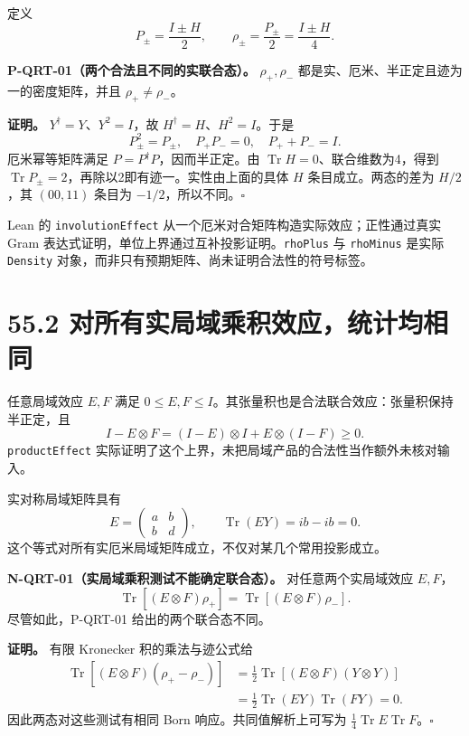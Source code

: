 \documentclass[
  11pt,
  oneside]{book}
\begin{document}
定义 \[
P_\pm=\frac{I\pm H}{2},\qquad
\rho_\pm=\frac{P_\pm}{2}=\frac{I\pm H}{4}.
\]

\protect\hypertarget{p-qrt-01}{}{}

\textbf{P-QRT-01（两个合法且不同的实联合态）。} \(\rho_+,\rho_-\)
都是实、厄米、半正定且迹为一的密度矩阵，并且 \(\rho_+\ne\rho_-\)。

\textbf{证明。} \(Y^\dagger=Y\)、\(Y^2=I\)，故
\(H^\dagger=H\)、\(H^2=I\)。于是 \[
P_\pm^2=P_\pm,\quad P_+P_-=0,\quad P_++P_-=I.
\] 厄米幂等矩阵满足 \(P=P^\dagger P\)，因而半正定。由
\(\operatorname{Tr}H=0\)、联合维数为4，得到
\(\operatorname{Tr}P_\pm=2\)，再除以2即有迹一。实性由上面的具体 \(H\)
条目成立。两态的差为 \(H/2\)，其 \((00,11)\) 条目为
\(-1/2\)，所以不同。\(\square\)

Lean 的 \texttt{involutionEffect}
从一个厄米对合矩阵构造实际效应；正性通过真实 Gram
表达式证明，单位上界通过互补投影证明。\texttt{rhoPlus} 与
\texttt{rhoMinus} 是实际 \texttt{Density}
对象，而非只有预期矩阵、尚未证明合法性的符号标签。

\hypertarget{ux5bf9ux6240ux6709ux5b9eux5c40ux57dfux4e58ux79efux6548ux5e94ux7edfux8ba1ux5747ux76f8ux540c}{%
\section{55.2
对所有实局域乘积效应，统计均相同}\label{ux5bf9ux6240ux6709ux5b9eux5c40ux57dfux4e58ux79efux6548ux5e94ux7edfux8ba1ux5747ux76f8ux540c}}

任意局域效应 \(E,F\) 满足
\(0\le E,F\le I\)。其张量积也是合法联合效应：张量积保持半正定，且 \[
I-E\otimes F=(I-E)\otimes I+E\otimes(I-F)\ge0.
\] \texttt{productEffect}
实际证明了这个上界，未把局域产品的合法性当作额外未核对输入。

实对称局域矩阵具有 \[
E=\begin{pmatrix}a&b\\b&d\end{pmatrix},
\qquad \operatorname{Tr}(EY)=ib-ib=0.
\] 这个等式对所有实厄米局域矩阵成立，不仅对某几个常用投影成立。

\protect\hypertarget{n-qrt-01}{}{}

\textbf{N-QRT-01（实局域乘积测试不能确定联合态）。} 对任意两个实局域效应
\(E,F\)， \[
\operatorname{Tr}[(E\otimes F)\rho_+]
=\operatorname{Tr}[(E\otimes F)\rho_-].
\] 尽管如此，P-QRT-01 给出的两个联合态不同。

\textbf{证明。} 有限 Kronecker 积的乘法与迹公式给 \[
\begin{aligned}
\operatorname{Tr}[(E\otimes F)(\rho_+-\rho_-)]
&=\tfrac12\operatorname{Tr}[(E\otimes F)(Y\otimes Y)]\\
&=\tfrac12\operatorname{Tr}(EY)\operatorname{Tr}(FY)=0.
\end{aligned}
\] 因此两态对这些测试有相同 Born 响应。共同值解析上可写为
\(\tfrac14\operatorname{Tr}E\operatorname{Tr}F\)。\(\square\)
\end{document}
